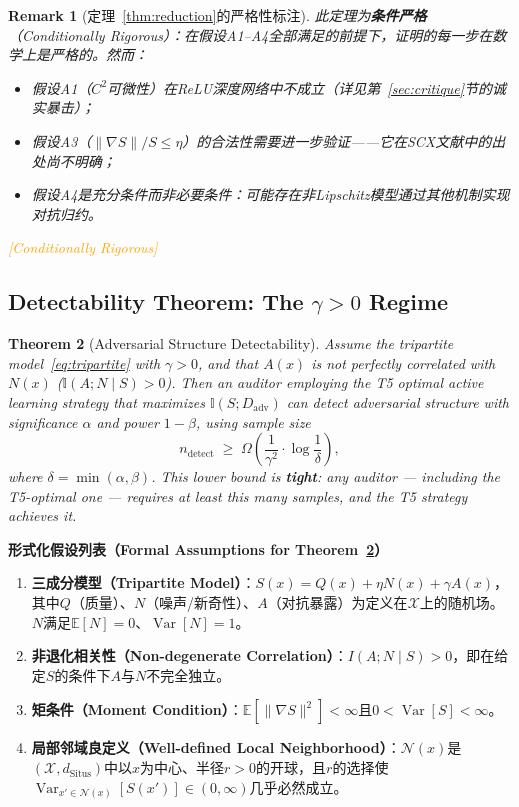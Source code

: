 \documentclass[12pt,a4paper]{article}
\newtheorem{theorem}{Theorem}[section]
\newtheorem{remark}[theorem]{Remark}
\newcommand{\conditionallyrigorous}{\textcolor{orange}{\small\textsf{[Conditionally Rigorous]}}}
\newcommand{\E}{\mathbb{E}}
\newcommand{\I}{\mathbb{I}}
\newcommand{\cX}{\mathcal{X}}
\newcommand{\cN}{\mathcal{N}}
\newcommand{\Situs}{\mathrm{Situs}}
\newcommand{\Var}{\operatorname{Var}}
\begin{document}
\begin{remark}[定理~\ref{thm:reduction}的严格性标注]
此定理为\textbf{条件严格}（Conditionally Rigorous）：在假设A1--A4全部满足的前提下，证明的每一步在数学上是严格的。然而：
\begin{itemize}
  \item 假设A1（$C^2$可微性）在ReLU深度网络中不成立（详见第~\ref{sec:critique}节的诚实暴击）；
  \item 假设A3（$\|\nabla S\|/S \leq \eta$）的合法性需要进一步验证——它在SCX文献中的出处尚不明确；
  \item 假设A4是充分条件而非必要条件：可能存在非Lipschitz模型通过其他机制实现对抗归约。
\end{itemize}
\conditionallyrigorous
\end{remark}

\subsection{Detectability Theorem: The $\gamma > 0$ Regime}

\begin{theorem}[Adversarial Structure Detectability]
\label{thm:detectability}
Assume the tripartite model~\eqref{eq:tripartite} with $\gamma > 0$, and
that $A(x)$ is not perfectly correlated with $N(x)$
($\I(A; N \mid S) > 0$).  Then an auditor employing the T5 optimal active
learning strategy that maximizes $\I(S; D_{\mathrm{adv}})$ can detect
adversarial structure with significance $\alpha$ and power $1-\beta$, using
sample size
\begin{equation}\label{eq:sample-complexity}
    n_{\mathrm{detect}}
    \;\geq\; \Omega\!\left(\frac{1}{\gamma^2} \cdot
    \log\frac{1}{\delta}\right),
\end{equation}
where $\delta = \min(\alpha, \beta)$.  This lower bound is \textbf{tight}:
any auditor --- including the T5-optimal one --- requires at least this many
samples, and the T5 strategy achieves it.
\end{theorem}

\medskip\noindent
\textbf{形式化假设列表（Formal Assumptions for Theorem~\ref{thm:detectability}）}

\begin{enumerate}[label=B\arabic*:]
\item \textbf{三成分模型（Tripartite Model）}：$S(x) = Q(x) + \eta N(x) + \gamma A(x)$，其中$Q$（质量）、$N$（噪声/新奇性）、$A$（对抗暴露）为定义在$\cX$上的随机场。$N$满足$\E[N] = 0$、$\Var[N] = 1$。\label{ass:ar2-trip}
\item \textbf{非退化相关性（Non-degenerate Correlation）}：$I(A; N \mid S) > 0$，即在给定$S$的条件下$A$与$N$不完全独立。\label{ass:ar2-ident}
\item \textbf{矩条件（Moment Condition）}：$\E[\|\nabla S\|^2] < \infty$且$0 < \Var[S] < \infty$。\label{ass:ar2-moment}
\item \textbf{局部邻域良定义（Well-defined Local Neighborhood）}：$\cN(x)$是$(\cX, d_{\Situs})$中以$x$为中心、半径$r>0$的开球，且$r$的选择使$\Var_{x' \in \cN(x)}[S(x')] \in (0, \infty)$几乎必然成立。\label{ass:ar2-nhood}
\end{enumerate}
\end{document}
